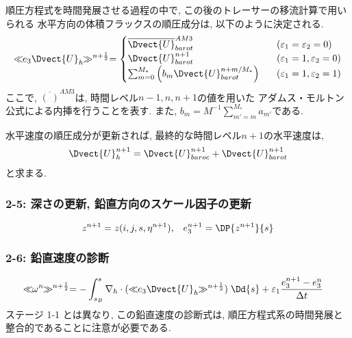 順圧方程式を時間発展させる過程の中で, この後のトレーサーの移流計算で用いられる
水平方向の体積フラックスの順圧成分は, 以下のように決定される.  
\begin{equation}
  \ll\!\! e_3 \Dvect{U}_h\!\!\gg^{n+\frac{1}{2}}
=\begin{cases}
\overline{\Dvect{U}}^{AM3}_{barot} \;\;\; &(\varepsilon_1=\varepsilon_2=0) \\
\Dvect{U}_{barot}^{n+1} \;\;\; &(\varepsilon_1=1, \varepsilon_2=0) \\
\sum_{m=0}^{M_*} \left( b_m \Dvect{U}_{barot}^{n+m/M_*} \right) 
      \;\;\; &(\varepsilon_1=1,\varepsilon_2=1)
\end{cases}
\end{equation}
ここで, $\overline{(\;)}^{AM3}$は, 時間レベル$n-1,n,n+1$の値を用いた 
アダムス・モルトン公式による内挿を行うことを表す. 
また, $b_m = M^{-1}\sum_{m'=m}^{M_*} a_{m'}$である.

水平速度の順圧成分が更新されば, 最終的な時間レベル$n+1$の水平速度は,  
\begin{align*}
 \Dvect{U}_h^{n+1} = \Dvect{U}_{baroc}^{n+1} + \Dvect{U}_{barot}^{n+1}
\end{align*}
と求まる. 
 
\subsubsection*{2-5: 深さの更新, 鉛直方向のスケール因子の更新}
\vspace{-1.2cm}
\begin{equation*}
  z^{n+1} = z(i,j,s,\eta^{n+1}), \;\;\;
  e_3^{n+1} = \DP{z^{n+1}}{s}
\end{equation*}

\subsubsection*{2-6: 鉛直速度の診断}
\vspace{-1.2cm}
\begin{align*}
 \ll\!\!\omega^n\!\!\gg^{n+\frac{1}{2}}
  = 
    -& \int_{s_B}^s \nabla_h \cdot 
       (\ll\!\! e_3 \Dvect{U}_h\!\!\gg^{n+\frac{1}{2}})  \;\Dd{s}
    + \varepsilon_1 \dfrac{e_3^{n+1} - e_3^{n}}{\Delta t}
\end{align*}
ステージ 1-1 とは異なり, この鉛直速度の診断式は, 
順圧方程式系の時間発展と整合的であることに注意が必要である. 
 
